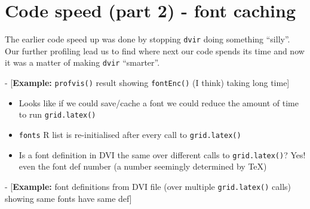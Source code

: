 \documentclass[]{article}
\begin{document}
\newpage{}

\section{Code speed (part 2) - font
caching}\label{code-speed-part-2---font-caching}

The earlier code speed up was done by stopping \texttt{dvir} doing
something ``silly''. Our further profiling lead us to find where next
our code spends its time and now it was a matter of making \texttt{dvir}
``smarter''.

- {[}\textbf{Example:} \texttt{profvis()} result showing
\texttt{fontEnc()} (I think) taking long time{]}

\begin{itemize}
\item
  Looks like if we could save/cache a font we could reduce the amount of
  time to run \texttt{grid.latex()}
\item
  \texttt{fonts} R list is re-initialised after every call to
  \texttt{grid.latex()}
\item
  Is a font definition in DVI the same over different calls to
  \texttt{grid.latex()}? Yes! even the font def number (a number
  seemingly determined by TeX)
\end{itemize}

- {[}\textbf{Example:} font definitions from DVI file (over multiple
\texttt{grid.latex()} calls) showing same fonts have same def{]}
\end{document}
